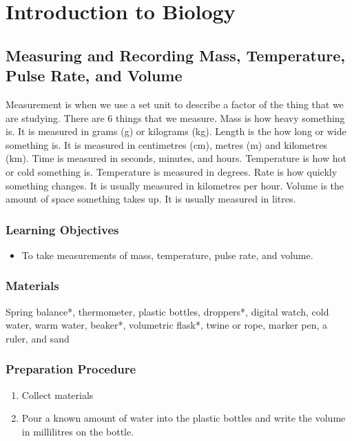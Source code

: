 \section{Introduction to Biology}

\subsection{Measuring and Recording Mass, Temperature, Pulse Rate, and Volume}
Measurement is when we use a set unit to describe a factor of the thing that we are studying. There are 6 things that we measure. Mass is how heavy something is. It is measured in grams (g) or kilograms (kg). Length is the how long or wide something is. It is measured in centimetres (cm), metres (m) and kilometres (km). Time is measured in seconds, minutes, and hours. Temperature is how hot or cold something is. Temperature is measured in degrees. Rate is how quickly something changes. It is usually measured in kilometres per hour. Volume is the amount of space something takes up. It is usually measured in litres.

\subsubsection*{Learning Objectives}
\begin{itemize}
\item{To take measurements of mass, temperature, pulse rate, and volume.}
\end{itemize}

\subsubsection*{Materials}
Spring balance*, thermometer, plastic bottles, droppers*, digital watch, cold water, warm water, beaker*, volumetric flask*, twine or rope, marker pen, a ruler, and sand

\subsubsection*{Preparation Procedure}
\begin{enumerate}
\item{Collect materials}
\item{Pour a known amount of water into the plastic bottles and write the volume in millilitres on the bottle.}
\end{enumerate}

